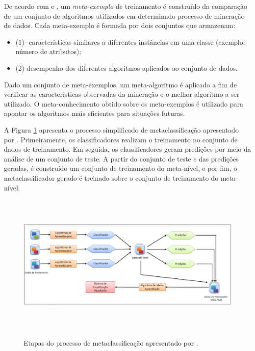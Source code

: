 De acordo com \citet{ferrari2014} e \citet{souza2010}, um \textit{meta-exemplo} de treinamento é construído da comparação de um conjunto de algoritmos utilizados em determinado processo de mineração de dados. Cada meta-exemplo é formada por dois conjuntos que armazenam:
\begin{itemize}
	\item (1)- características similares a diferentes instâncias em uma classe (exemplo: número de atributos);
	\item (2)-desempenho dos diferentes algoritmos aplicados ao conjunto de dados.
\end{itemize}

Dado um conjunto de meta-exemplos, um meta-algoritmo é aplicado a fim de verificar as características observadas da mineração e o melhor algoritmo a ser utilizado. O meta-conhecimento obtido sobre os meta-exemplos é utilizado para apontar os algoritmos mais eficientes para situações futuras.

A Figura \ref{meta-classificacao} apresenta o processo simplificado de metaclassificação apresentado por \citet{bezerra2015}. Primeiramente, os classificadores realizam o treinamento no conjunto de dados de treinamento. Em seguida, os classificadores geram predições por meio da análise de um conjunto de teste. A partir do conjunto de teste e das predições geradas, é construído um conjunto de treinamento do meta-nível, e por fim, o metaclassificador gerado é treinado sobre o conjunto de treinamento do meta-nível.

\begin{figure}[!htb]
	\centering
	{\includegraphics[width=15cm, height=7cm]{images/meta-aprendizado}}
	\caption {Etapas do processo de metaclassificação apresentado por \citet{bezerra2015}.}
	\label{meta-classificacao}
\end{figure}

